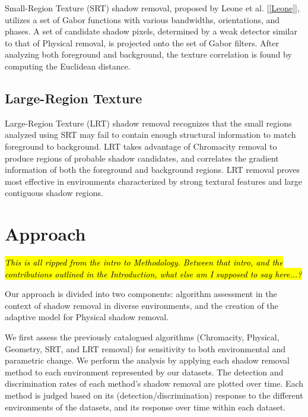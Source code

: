 \documentclass[12pt]{report}
\begin{document}
Small-Region Texture (SRT) shadow removal, proposed by Leone et al. [\ref{Leone}], utilizes a set of Gabor functions with various bandwidths, orientations, and phases. A set of candidate shadow pixels, determined by a weak detector similar to that of Physical removal, is projected onto the set of Gabor filters. After analyzing both foreground and background, the texture correlation is found by computing the Euclidean distance.

\subsection{Large-Region Texture}

Large-Region Texture (LRT) shadow removal recognizes that the small regions analyzed using SRT may fail to contain enough structural information to match foreground to background. LRT takes advantage of Chromacity removal to produce regions of probable shadow candidates, and correlates the gradient information of both the foreground and background regions. LRT removal proves most effective in environments characterized by strong textural features and large contiguous shadow regions.


\section{Approach}

\hl{\textit{This is all ripped from the intro to Methodology. Between that intro, and the contributions outlined in the Introduction, what else am I supposed to say here...?}}

Our approach is divided into two components: algorithm assessment in the context of shadow removal in diverse environments, and the creation of the adaptive model for Physical shadow removal.

We first assess the previously catalogued algorithms (Chromacity, Physical, Geometry, SRT, and LRT removal) for sensitivity to both environmental and parametric change. We perform the analysis by applying each shadow removal method to each  environment represented by our datasets. The detection and discrimination rates of each method's shadow removal are plotted over time. Each method is judged based on its (detection/discrimination) response to the different environments of the datasets, and its response over time within each dataset.
\end{document}
